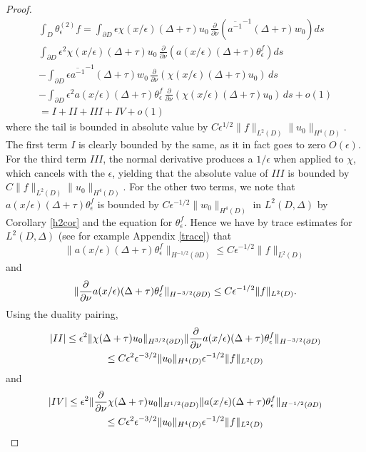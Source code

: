 \documentclass[12pt]{article}
\begin{document}
\begin{proof}
\begin{multline}
\int_ D \theta_\epsilon^{(2)} f =  \int_{\partial  D}\epsilon\chi(x/\epsilon)(\Delta +\tau)u_0 \, \frac{\partial}{\partial\nu}\left(  \overline{a^{-1}}^{-1} (\Delta +\tau) w_0\right)ds\\ \int_{\partial  D}\epsilon^2\chi(x/\epsilon)(\Delta +\tau)u_0 \, \frac{\partial}{\partial\nu}\left(  a(x/\epsilon) (\Delta +\tau) \theta^f_\epsilon\right)ds \\ - \int_{\partial D} \epsilon  \overline{a^{-1}}^{-1}  (\Delta +\tau) w_0\,\frac{\partial}{\partial\nu} \left(\chi(x/\epsilon)(\Delta +\tau)u_0\right) \, ds \\- \int_{\partial D} \epsilon^2 a(x/\epsilon) (\Delta +\tau) \theta^f_\epsilon \,\frac{\partial}{\partial\nu} \left(\chi(x/\epsilon)(\Delta +\tau)u_0\right) \, ds +o(1) \\ = I+II +III +IV +o(1)
\end{multline}
where the tail is bounded in absolute value by $C\epsilon^{1/2}\| f \|_{L^2(D)} \| u_0\| _{H^4(D)}$. The first term $I$ is clearly bounded by the same, as it in fact goes to zero $O(\epsilon)$. For the third term $III$, the normal derivative produces a $1/\epsilon$ when applied to $\chi$, which cancels with the $\epsilon$, yielding that the absolute value of $III$ is bounded by $C\| f \|_{L^2(D)} \| u_0\| _{H^4(D)}$.  For the other two terms, we note that $ a(x/\epsilon) (\Delta +\tau) \theta^f_\epsilon $ is bounded by $ C\epsilon^{-1/2} \| w_0 \|_{H^4(D)}$ in $L^2(D,\Delta)$ by Corollary \ref{h2cor} and the equation for $\theta^f_\epsilon$.  Hence we have by trace estimates for $L^2(D,\Delta)$  (see for example Appendix \ref{trace})  that $$ \| a(x/\epsilon) (\Delta +\tau) \theta^f_\epsilon \|_{H^{-1/2}(\partial D)} \leq C\epsilon^{-1/2} \| f \|_{L^2(D)} $$ and
$$ \| {\partial\over{\partial\nu}} a(x/\epsilon) (\Delta +\tau) \theta^f_\epsilon \|_{H^{-3/2}(\partial D)} \leq C\epsilon^{-1/2} \| f \|_{L^2(D)}. $$
Using the duality pairing, 
\begin{multline} | II | \leq  \epsilon^2 \| \chi(\Delta +\tau)u_0 \|_{H^{3/2}(\partial D)}  \| {\partial\over{\partial\nu}} a(x/\epsilon) (\Delta +\tau) \theta^f_\epsilon \|_{H^{-3/2}(\partial D)} \\ \leq  C\epsilon^2 \epsilon^{-3/2} \| u_0\|_{H^4(D)} \epsilon^{-1/2} \| f \|_{L^2(D)} \end{multline} 
and \begin{multline}  | IV | \leq  \epsilon^2 \| {\partial\over{\partial\nu}} \chi(\Delta +\tau)u_0 \|_{H^{1/2}(\partial D)}  \| a(x/\epsilon) (\Delta +\tau) \theta^f_\epsilon \|_{H^{-1/2}(\partial D)} \\ \leq  C\epsilon^2 \epsilon^{-3/2} \| u_0\|_{H^4(D)} \epsilon^{-1/2} \| f \|_{L^2(D)} \end{multline} 

\end{proof}
\end{document}
